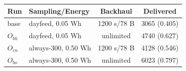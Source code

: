 \begin{tabular}{llcc}
\toprule
Run & Sampling/Energy & Backhaul & Delivered\\
\midrule
base & dayfeed, 0.05 Wh & 1200 s/78 B & 3065 (0.405)\\
$O_{bh}$ & dayfeed, 0.05 Wh & unlimited & 4740 (0.627)\\
$O_{en}$ & always-300, 0.50 Wh & 1200 s/78 B & 4128 (0.546)\\
$O_{bo}$ & always-300, 0.50 Wh & unlimited & 6023 (0.797)\\
\bottomrule
\end{tabular}
